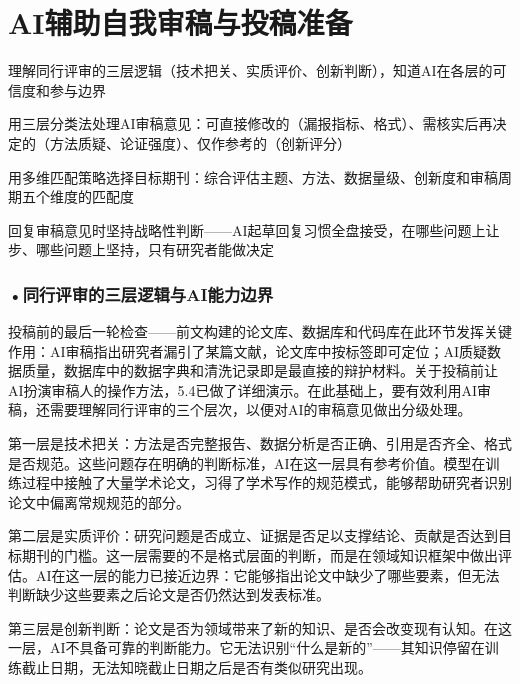 \section{AI辅助自我审稿与投稿准备}
\label{sec:5.6}

\begin{sectionkeypoints}
\item 理解同行评审的三层逻辑（技术把关、实质评价、创新判断），知道AI在各层的可信度和参与边界
\item 用三层分类法处理AI审稿意见：可直接修改的（漏报指标、格式）、需核实后再决定的（方法质疑、论证强度）、仅作参考的（创新评分）
\item 用多维匹配策略选择目标期刊：综合评估主题、方法、数据量级、创新度和审稿周期五个维度的匹配度
\item 回复审稿意见时坚持战略性判断——AI起草回复习惯全盘接受，在哪些问题上让步、哪些问题上坚持，只有研究者能做决定
\end{sectionkeypoints}

\subsubsection*{\textbf{•同行评审的三层逻辑与AI能力边界}}

投稿前的最后一轮检查——前文构建的论文库、数据库和代码库在此环节发挥关键作用：AI审稿指出研究者漏引了某篇文献，论文库中按标签即可定位；AI质疑数据质量，数据库中的数据字典和清洗记录即是最直接的辩护材料。关于投稿前让AI扮演审稿人的操作方法，5.4已做了详细演示。在此基础上，要有效利用AI审稿，还需要理解同行评审的三个层次，以便对AI的审稿意见做出分级处理。

第一层是技术把关：方法是否完整报告、数据分析是否正确、引用是否齐全、格式是否规范。这些问题存在明确的判断标准，AI在这一层具有参考价值。模型在训练过程中接触了大量学术论文，习得了学术写作的规范模式，能够帮助研究者识别论文中偏离常规规范的部分。

第二层是实质评价：研究问题是否成立、证据是否足以支撑结论、贡献是否达到目标期刊的门槛。这一层需要的不是格式层面的判断，而是在领域知识框架中做出评估。AI在这一层的能力已接近边界：它能够指出论文中缺少了哪些要素，但无法判断缺少这些要素之后论文是否仍然达到发表标准。

第三层是创新判断：论文是否为领域带来了新的知识、是否会改变现有认知。在这一层，AI不具备可靠的判断能力。它无法识别``什么是新的''——其知识停留在训练截止日期，无法知晓截止日期之后是否有类似研究出现。

